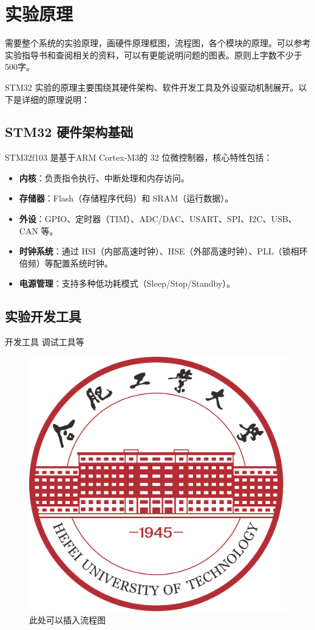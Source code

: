 \documentclass[12pt,hyperref,a4paper,twoside,UTF8]{ctexart}
\begin{document}
\section{实验原理}

需要整个系统的实验原理，画硬件原理框图，流程图，各个模块的原理。可以参考实验指导书和查阅相关的资料，可以有更能说明问题的图表。原则上字数不少于500字。

STM32 实验的原理主要围绕其硬件架构、软件开发工具及外设驱动机制展开。以下是详细的原理说明：

\subsection{STM32 硬件架构基础}

STM32f103 是基于ARM Cortex-M3的 32 位微控制器，核心特性包括：
\begin{itemize}

\item \textbf{内核}：负责指令执行、中断处理和内存访问。
\item \textbf{存储器}：Flash（存储程序代码）和 SRAM（运行数据）。
\item \textbf{外设}：GPIO、定时器（TIM）、ADC/DAC、USART、SPI、I2C、USB、CAN 等。
\item \textbf{时钟系统}：通过 HSI（内部高速时钟）、HSE（外部高速时钟）、PLL（锁相环倍频）等配置系统时钟。
\item \textbf{电源管理}：支持多种低功耗模式（Sleep/Stop/Standby）。

\end{itemize}


\subsection{实验开发工具}

开发工具  调试工具等

\begin{figure}[!htbp]
    \centering
    \includegraphics[width =.3\textwidth]{figures/hfutlogo.png}
    \caption{此处可以插入流程图}
    \label{Library}
\end{figure}
\end{document}
